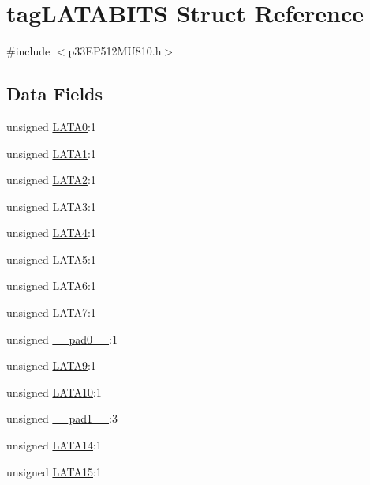 \hypertarget{structtag_l_a_t_a_b_i_t_s}{}\section{tag\+L\+A\+T\+A\+B\+I\+TS Struct Reference}
\label{structtag_l_a_t_a_b_i_t_s}


{\ttfamily \#include $<$p33\+E\+P512\+M\+U810.\+h$>$}

\subsection*{Data Fields}
\begin{DoxyCompactItemize}
\item 
unsigned \hyperlink{structtag_l_a_t_a_b_i_t_s_a6fcf9e0b57006985c36ba76fd7bc13d8}{L\+A\+T\+A0}\+:1
\item 
unsigned \hyperlink{structtag_l_a_t_a_b_i_t_s_a77e1a5f1eaa1f522e9d6f51fa3f4610c}{L\+A\+T\+A1}\+:1
\item 
unsigned \hyperlink{structtag_l_a_t_a_b_i_t_s_a4a36a70971ce7eae653077879fe88522}{L\+A\+T\+A2}\+:1
\item 
unsigned \hyperlink{structtag_l_a_t_a_b_i_t_s_a8eea54e1be8c153248bdc06bbdd5bcf1}{L\+A\+T\+A3}\+:1
\item 
unsigned \hyperlink{structtag_l_a_t_a_b_i_t_s_ac8eac35306eab37b11a4271107979af2}{L\+A\+T\+A4}\+:1
\item 
unsigned \hyperlink{structtag_l_a_t_a_b_i_t_s_a8aee660134772ea9145da72bd747d899}{L\+A\+T\+A5}\+:1
\item 
unsigned \hyperlink{structtag_l_a_t_a_b_i_t_s_ad1e58949c0d3d2f7b4de9624d2140ca2}{L\+A\+T\+A6}\+:1
\item 
unsigned \hyperlink{structtag_l_a_t_a_b_i_t_s_ae0dfbd26007eb663892e8ce0dbe13ca9}{L\+A\+T\+A7}\+:1
\item 
unsigned \hyperlink{structtag_l_a_t_a_b_i_t_s_adf71f3d8410c1f1dbbc96680a92c49af}{\+\_\+\+\_\+pad0\+\_\+\+\_\+}\+:1
\item 
unsigned \hyperlink{structtag_l_a_t_a_b_i_t_s_ae5e26b740e60e01bf7e0b52366f28c4c}{L\+A\+T\+A9}\+:1
\item 
unsigned \hyperlink{structtag_l_a_t_a_b_i_t_s_ab06278d0132135d4adbff1ced7071ad9}{L\+A\+T\+A10}\+:1
\item 
unsigned \hyperlink{structtag_l_a_t_a_b_i_t_s_acaf2d0924a107ec6e8d2e31febaf66f9}{\+\_\+\+\_\+pad1\+\_\+\+\_\+}\+:3
\item 
unsigned \hyperlink{structtag_l_a_t_a_b_i_t_s_a43a080b0c4fc047db3cca7409b5901c0}{L\+A\+T\+A14}\+:1
\item 
unsigned \hyperlink{structtag_l_a_t_a_b_i_t_s_a055265edefb6d29eb45da8a0e13e9f2b}{L\+A\+T\+A15}\+:1
\end{DoxyCompactItemize}


